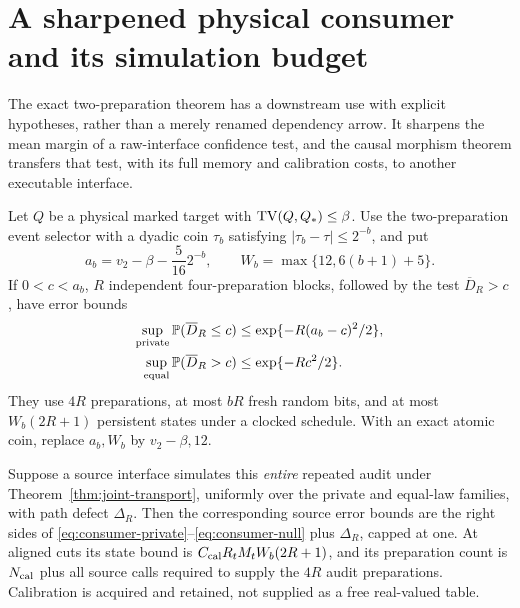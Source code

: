 \section{A sharpened physical consumer and its simulation budget}
\label{sec:new-consumer}
The exact two-preparation theorem has a downstream use with explicit
hypotheses, rather than a merely renamed dependency arrow. It sharpens
the mean margin of a raw-interface confidence test, and the causal
morphism theorem transfers that test, with its full memory and
calibration costs, to another executable interface.

\begin{theorem}
\label{thm:transported-consumer}
Let $Q$ be a physical marked target with $\operatorname{TV}(Q,Q_*)\le\beta$.
Use the two-preparation event selector with a dyadic coin $\tau_b$
satisfying $|\tau_b-\tau|\le2^{-b}$, and put
\[
 a_b=v_2-\beta-\frac5{16}2^{-b},\qquad
 W_b=\max\{12,6(b+1)+5\}.
\]
If $0<c<a_b$, $R$ independent four-preparation blocks, followed by the
test $\overline D_R>c$, have error bounds
\begin{align}
 \sup_{\rm private}\mathbb P(\overline D_R\le c)
       &\le \exp\{-R(a_b-c)^2/2\},\label{eq:consumer-private}\\
 \sup_{\rm equal}\mathbb P(\overline D_R>c)
       &\le \exp\{-Rc^2/2\}.                         \label{eq:consumer-null}
\end{align}
They use $4R$ preparations, at most $bR$ fresh random bits, and at most
$W_b(2R+1)$ persistent states under a clocked schedule. With an exact
atomic coin, replace $a_b,W_b$ by $v_2-\beta,12$.

Suppose a source interface simulates this \emph{entire} repeated audit
under Theorem~\ref{thm:joint-transport}, uniformly over the private and
equal-law families, with path defect $\Delta_R$. Then the corresponding
source error bounds are the right sides of
\eqref{eq:consumer-private}--\eqref{eq:consumer-null} plus $\Delta_R$,
capped at one. At aligned cuts its state bound is
$C_{\rm cal}R_tM_tW_b(2R+1)$, and its preparation count is
$N_{\rm cal}$ plus all source calls required to supply the $4R$ audit
preparations. Calibration is acquired and retained, not supplied as a
free real-valued table.
\end{theorem}
